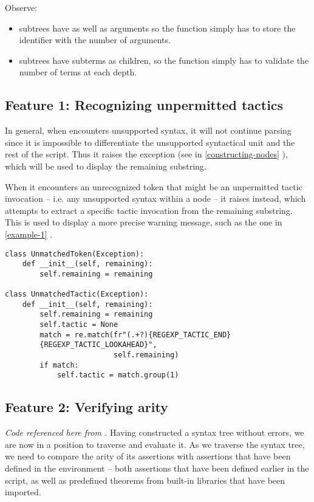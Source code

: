 Observe:
\begin{itemize}
    \item {} subtrees have  as well as  arguments so the  function simply has to store the identifier with the number of arguments.
    \item {} subtrees have subterms as children, so the  function simply has to validate the number of terms at each depth.
\end{itemize}

\subsection{Feature 1: Recognizing unpermitted tactics}
In general, when  encounters unsupported syntax, it will not continue parsing since it is impossible to differentiate the unsupported syntactical unit and the rest of the script. Thus it raises the  exception (see  in \ref{constructing-nodes} ), which will be used to display the remaining substring.

When it encounters an unrecognized token that might be an unpermitted tactic invocation – i.e. any unsupported syntax within a  node – it raises  instead, which attempts to extract a specific tactic invocation from the remaining substring. This is used to display a more precise warning message, such as the one in \ref{example-1} .

\begin{verbatim}
class UnmatchedToken(Exception):
    def __init__(self, remaining):
        self.remaining = remaining

class UnmatchedTactic(Exception):
    def __init__(self, remaining):
        self.remaining = remaining
        self.tactic = None
        match = re.match(fr"(.+?){REGEXP_TACTIC_END}
        {REGEXP_TACTIC_LOOKAHEAD}",
                         self.remaining)
        if match:
            self.tactic = match.group(1)
\end{verbatim}

\subsection{Feature 2: Verifying arity}
\emph{Code referenced here from .}
Having constructed a syntax tree without errors, we are now in a position to traverse and evaluate it. As we traverse the syntax tree, we need to compare the arity of its assertions with assertions that have been defined in the environment – both assertions that have been defined earlier in the script, as well as predefined theorems from built-in libraries that have been imported.

